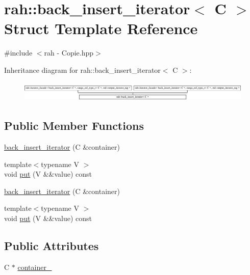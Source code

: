 \hypertarget{structrah_1_1back__insert__iterator}{}\section{rah\+::back\+\_\+insert\+\_\+iterator$<$ C $>$ Struct Template Reference}
\label{structrah_1_1back__insert__iterator}


{\ttfamily \#include $<$rah -\/ Copie.\+hpp$>$}

Inheritance diagram for rah\+::back\+\_\+insert\+\_\+iterator$<$ C $>$\+:\begin{figure}[H]
\begin{center}
\leavevmode
\includegraphics[height=0.973913cm]{structrah_1_1back__insert__iterator}
\end{center}
\end{figure}
\subsection*{Public Member Functions}
\begin{DoxyCompactItemize}
\item 
\mbox{\hyperlink{structrah_1_1back__insert__iterator_a7c208b6bee5af4ca1f87a0a52df8069c}{back\+\_\+insert\+\_\+iterator}} (C \&container)
\item 
{\footnotesize template$<$typename V $>$ }\\void \mbox{\hyperlink{structrah_1_1back__insert__iterator_a5af149b87aebf5ced8a4143afe79ad50}{put}} (V \&\&value) const
\item 
\mbox{\hyperlink{structrah_1_1back__insert__iterator_a7c208b6bee5af4ca1f87a0a52df8069c}{back\+\_\+insert\+\_\+iterator}} (C \&container)
\item 
{\footnotesize template$<$typename V $>$ }\\void \mbox{\hyperlink{structrah_1_1back__insert__iterator_a5af149b87aebf5ced8a4143afe79ad50}{put}} (V \&\&value) const
\end{DoxyCompactItemize}
\subsection*{Public Attributes}
\begin{DoxyCompactItemize}
\item 
C $\ast$ \mbox{\hyperlink{structrah_1_1back__insert__iterator_ad60a5db0dd4ae59777b739c5a581f635}{container\+\_\+}}
\end{DoxyCompactItemize}


